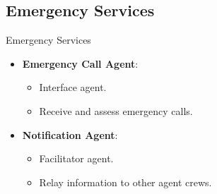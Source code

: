 \subsection{Emergency Services}
\begin{frame}{Emergency Services}
    \begin{itemize}
        \item \textbf{Emergency Call Agent}:
        \begin{itemize}
            \item \alert{Interface} agent.
            \item Receive and assess emergency calls.
        \end{itemize}
        \item \textbf{Notification Agent}:
        \begin{itemize}
            \item \alert{Facilitator} agent.
            \item Relay information to \alert{other agent crews}.
        \end{itemize}
    \end{itemize}
\end{frame} 